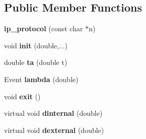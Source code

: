 \subsection*{Public Member Functions}
\begin{DoxyCompactItemize}
\item 
{\bfseries ip\+\_\+protocol} (const char $\ast$n)\hypertarget{classip__protocol_af3d5fa13a4175ab93d431ad38e7c3712}{}\label{classip__protocol_af3d5fa13a4175ab93d431ad38e7c3712}

\item 
void {\bfseries init} (double,...)\hypertarget{classip__protocol_a41b4678b7d525775ca4ed84dd4f8daac}{}\label{classip__protocol_a41b4678b7d525775ca4ed84dd4f8daac}

\item 
double {\bfseries ta} (double t)\hypertarget{classip__protocol_a799af7a028afc688255e9efe732e00f4}{}\label{classip__protocol_a799af7a028afc688255e9efe732e00f4}

\item 
Event {\bfseries lambda} (double)\hypertarget{classip__protocol_ae92e4088780f38a62419a202d53e2511}{}\label{classip__protocol_ae92e4088780f38a62419a202d53e2511}

\item 
void {\bfseries exit} ()\hypertarget{classip__protocol_aed94f19da59b71685e9d17de4febcd75}{}\label{classip__protocol_aed94f19da59b71685e9d17de4febcd75}

\item 
virtual void {\bfseries dinternal} (double)\hypertarget{classip__protocol_a5c4dd62ee8cffa83a592f29306686be9}{}\label{classip__protocol_a5c4dd62ee8cffa83a592f29306686be9}

\item 
virtual void {\bfseries dexternal} (double)\hypertarget{classip__protocol_a34e2cc9e802edf0ba1fdbcbcbee92f5b}{}\label{classip__protocol_a34e2cc9e802edf0ba1fdbcbcbee92f5b}

\end{DoxyCompactItemize}
